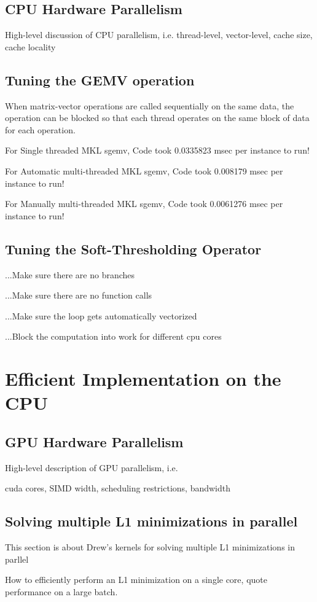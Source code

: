 \documentclass[10pt,twocolumn,letterpaper]{article}
\begin{document}
\subsection{CPU Hardware Parallelism}
High-level discussion of CPU parallelism, i.e.
thread-level, vector-level, cache size, cache locality
\subsection{Tuning the GEMV operation}
When matrix-vector operations are called sequentially on the same data,
the operation can be blocked so that each thread operates on the same block of data for each operation.

For Single threaded MKL sgemv, Code took          0.0335823 msec per instance to run!

For Automatic multi-threaded MKL sgemv, Code took 0.008179 msec per instance to run!

For Manually multi-threaded MKL sgemv, Code took  0.0061276 msec per instance to run!

\subsection{Tuning the Soft-Thresholding Operator}
...Make sure there are no branches

...Make sure there are no function calls

...Make sure the loop gets automatically vectorized

...Block the computation into work for different cpu cores

\section{Efficient Implementation on the CPU}
\subsection{GPU Hardware Parallelism}
High-level description of GPU parallelism, i.e.

cuda cores, SIMD width, scheduling restrictions, bandwidth

\subsection{Solving multiple L1 minimizations in parallel}
This section is about Drew's kernels for solving multiple L1 minimizations in parllel

How to efficiently perform an L1 minimization on a single core, quote performance on a large batch.
\end{document}
